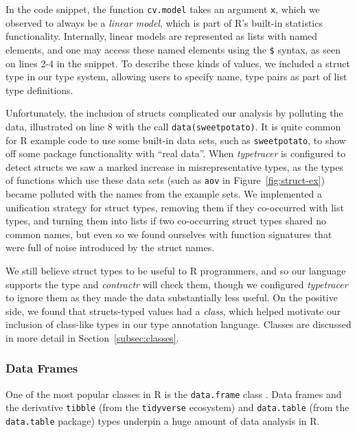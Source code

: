 \documentclass[acmsmall,review,anonymous]{acmart}\settopmatter{printfolios=true,printccs=false,printacmref=false}
\newcommand{\code}[1]{{\lstinline[style=Rin]!#1!}\xspace}
\newcommand{\contractr}{\emph{contractr}\xspace} %
\newcommand{\typetracer}{\emph{typetracer}\xspace} %
\begin{document}
In the code snippet, the function \code{cv.model} takes an argument \code{x}, which we observed to always be a {\it linear model}, which is part of R's built-in statistics functionality.
Internally, linear models are represented as lists with named elements, and one may access these named elements using the \code{$} syntax, as seen on lines 2-4 in the snippet.
To describe these kinds of values, we included a struct type in our type system, allowing users to specify name, type pairs as part of list type definitions.

Unfortunately, the inclusion of structs complicated our analysis by polluting the data, illustrated on line 8 with the call \code{data(sweetpotato)}.
It is quite common for R example code to use some built-in data sets, such as \code{sweetpotato}, to show off some package functionality with ``real data''.
When \typetracer is configured to detect structs we saw a marked increase in misrepresentative types, as the types of functions which use these data sets (such as \code{aov} in Figure~\ref{fig:struct-ex}) became polluted with the names from the example sets.
We implemented a unification strategy for struct types, removing them if they co-occurred with list types, and turning them into lists if two co-occurring struct types shared no common names, but even so we found ourselves with function signatures that were full of noise introduced by the struct names.

We still believe struct types to be useful to R programmers, and so our language supports the type and \contractr will check them, though we configured \typetracer to ignore them as they made the data substantially less useful.
On the positive side, we found that  structs-typed values had a {\it class}, which helped motivate our inclusion of class-like types in our type annotation language.
Classes are discussed in more detail in Section~\ref{subsec:classes}.


%
%
\subsubsection{Data Frames}

One of the most popular classes in R is the \code{data.frame} class .
Data frames and the derivative \code{tibble} (from the \code{tidyverse} ecosystem) and \code{data.table} (from the \code{data.table} package) types underpin a huge amount of data analysis in R.
\end{document}
